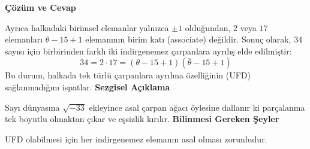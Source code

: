 \documentclass[11pt, a4paper]{article}
\newenvironment{cozum}{
    \vspace{0.5cm}
    \noindent\textcolor{green!60!black}{\faCheckCircle\enspace \textbf{\Large Çözüm ve Cevap}}\par\vspace{0.2cm}
}{}
\newenvironment{sezgisel}{
    \vspace{0.5cm}
    \noindent\textcolor{orange!80!black}{\faLightbulb\enspace \textbf{\Large Sezgisel Açıklama}}\par\vspace{0.2cm}
    \itshape
}{}
\newenvironment{bilgi}{
    \vspace{0.5cm}
    \noindent\textcolor{red!70!black}{\faExclamationTriangle\enspace \textbf{\Large Bilinmesi Gereken Şeyler}}\par\vspace{0.2cm}
}{}
\begin{document}
\begin{cozum}
Ayrıca halkadaki birimsel elemanlar yalnızca $\pm 1$ olduğundan, $2$ veya $17$ elemanları $\theta - 15 + 1$ elemanının birim katı (associate) değildir. Sonuç olarak, $34$ sayısı için birbirinden farklı iki indirgenemez çarpanlara ayrılış elde edilmiştir:
\[ 34 = 2 \cdot 17 = (\theta - 15 + 1)(\bar{\theta} - 15 + 1) \]
Bu durum, halkada tek türlü çarpanlara ayrılma özelliğinin (UFD) sağlanmadığını ispatlar.
\end{cozum}
\begin{sezgisel}
Sayı dünyasına $\sqrt{-33}$ ekleyince asal çarpan ağacı öylesine dallanır ki parçalanma tek boyutlu olmaktan çıkar ve eşsizlik kırılır.
\end{sezgisel}
\begin{bilgi}
UFD olabilmesi için her indirgenemez elemanın asal olması zorunludur.
\end{bilgi}

\newpage
\end{document}
